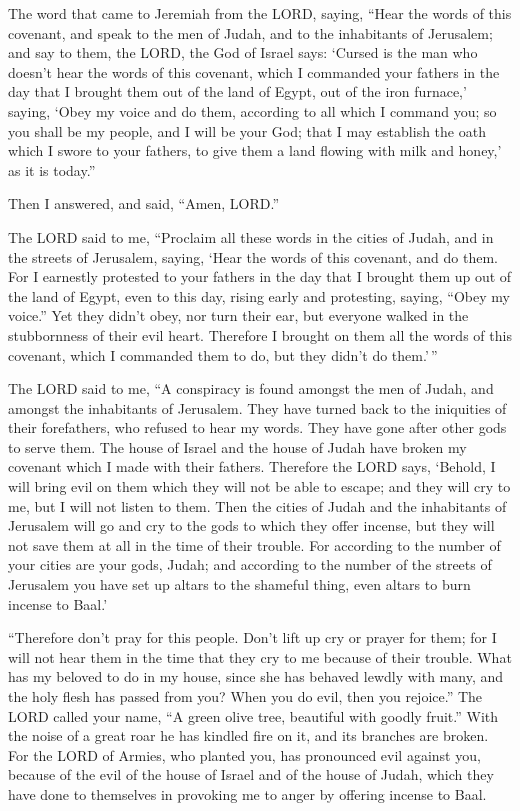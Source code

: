  The word that came to Jeremiah from the LORD, saying,
 ``Hear the words of this covenant, and speak to the men of
Judah, and to the inhabitants of Jerusalem;  and say to
them, the LORD, the God of Israel says: `Cursed is the man who doesn't
hear the words of this covenant,  which I commanded your
fathers in the day that I brought them out of the land of Egypt, out of
the iron furnace,' saying, `Obey my voice and do them, according to all
which I command you; so you shall be my people, and I will be your God;
 that I may establish the oath which I swore to your
fathers, to give them a land flowing with milk and honey,' as it is
today.''

Then I answered, and said, ``Amen, LORD.''

 The LORD said to me, ``Proclaim all these words in the
cities of Judah, and in the streets of Jerusalem, saying, `Hear the
words of this covenant, and do them.  For I earnestly
protested to your fathers in the day that I brought them up out of the
land of Egypt, even to this day, rising early and protesting, saying,
``Obey my voice.''  Yet they didn't obey, nor turn their
ear, but everyone walked in the stubbornness of their evil heart.
Therefore I brought on them all the words of this covenant, which I
commanded them to do, but they didn't do them.'\,''

 The LORD said to me, ``A conspiracy is found amongst the
men of Judah, and amongst the inhabitants of Jerusalem. 
They have turned back to the iniquities of their forefathers, who
refused to hear my words. They have gone after other gods to serve them.
The house of Israel and the house of Judah have broken my covenant which
I made with their fathers.  Therefore the LORD says,
`Behold, I will bring evil on them which they will not be able to
escape; and they will cry to me, but I will not listen to them.
 Then the cities of Judah and the inhabitants of Jerusalem
will go and cry to the gods to which they offer incense, but they will
not save them at all in the time of their trouble.  For
according to the number of your cities are your gods, Judah; and
according to the number of the streets of Jerusalem you have set up
altars to the shameful thing, even altars to burn incense to Baal.'

 ``Therefore don't pray for this people. Don't lift up cry
or prayer for them; for I will not hear them in the time that they cry
to me because of their trouble.  What has my beloved to do
in my house, since she has behaved lewdly with many, and the holy flesh
has passed from you? When you do evil, then you rejoice.'' 
The LORD called your name, ``A green olive tree, beautiful with goodly
fruit.'' With the noise of a great roar he has kindled fire on it, and
its branches are broken.  For the LORD of Armies, who
planted you, has pronounced evil against you, because of the evil of the
house of Israel and of the house of Judah, which they have done to
themselves in provoking me to anger by offering incense to Baal.

